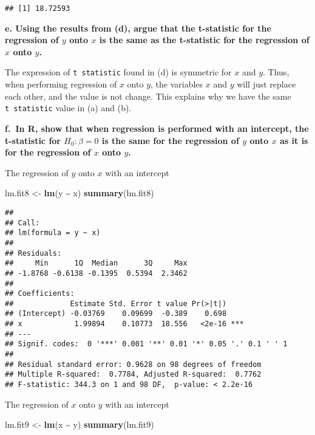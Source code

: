 \documentclass[
]{article}
\newenvironment{Shaded}{\begin{snugshade}}{\end{snugshade}}
\newcommand{\FunctionTok}[1]{\textcolor[rgb]{0.13,0.29,0.53}{\textbf{#1}}}
\newcommand{\NormalTok}[1]{#1}
\newcommand{\OtherTok}[1]{\textcolor[rgb]{0.56,0.35,0.01}{#1}}
\newcommand{\SpecialCharTok}[1]{\textcolor[rgb]{0.81,0.36,0.00}{\textbf{#1}}}
\begin{document}
\begin{verbatim}
## [1] 18.72593
\end{verbatim}

\textbf{e. Using the results from (d), argue that the t-statistic for
the regression of \(y\) onto \(x\) is the same as the t-statistic for
the regression of \(x\) onto \(y\).}

The expression of \texttt{t\ statistic} found in (d) is symmetric for
\(x\) and \(y\). Thus, when performing regression of \(x\) onto \(y\),
the variables \(x\) and \(y\) will just replace each other, and the
value is not change. This explains why we have the same
\texttt{t\ statistic} value in (a) and (b).

\textbf{f.~In R, show that when regression is performed with an
intercept, the t-statistic for \(H_0: \beta=0\) is the same for the
regression of \(y\) onto \(x\) as it is for the regression of \(x\) onto
\(y\).}

The regression of \(y\) onto \(x\) with an intercept

\begin{Shaded}
\begin{Highlighting}[]
\NormalTok{lm.fit8 }\OtherTok{\textless{}{-}} \FunctionTok{lm}\NormalTok{(y }\SpecialCharTok{\textasciitilde{}}\NormalTok{ x)}
\FunctionTok{summary}\NormalTok{(lm.fit8)}
\end{Highlighting}
\end{Shaded}

\begin{verbatim}
## 
## Call:
## lm(formula = y ~ x)
## 
## Residuals:
##     Min      1Q  Median      3Q     Max 
## -1.8768 -0.6138 -0.1395  0.5394  2.3462 
## 
## Coefficients:
##             Estimate Std. Error t value Pr(>|t|)    
## (Intercept) -0.03769    0.09699  -0.389    0.698    
## x            1.99894    0.10773  18.556   <2e-16 ***
## ---
## Signif. codes:  0 '***' 0.001 '**' 0.01 '*' 0.05 '.' 0.1 ' ' 1
## 
## Residual standard error: 0.9628 on 98 degrees of freedom
## Multiple R-squared:  0.7784, Adjusted R-squared:  0.7762 
## F-statistic: 344.3 on 1 and 98 DF,  p-value: < 2.2e-16
\end{verbatim}

The regression of \(x\) onto \(y\) with an intercept

\begin{Shaded}
\begin{Highlighting}[]
\NormalTok{lm.fit9 }\OtherTok{\textless{}{-}} \FunctionTok{lm}\NormalTok{(x }\SpecialCharTok{\textasciitilde{}}\NormalTok{ y)}
\FunctionTok{summary}\NormalTok{(lm.fit9)}
\end{Highlighting}
\end{Shaded}
\end{document}
